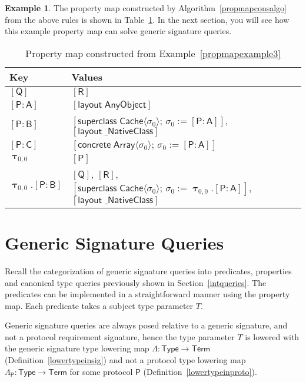 \documentclass[headsepline,bibliography=totoc]{scrreport}
\newcommand{\namesym}[1]{\mathsf{#1}}
\newcommand{\proto}[1]{\bm{\mathsf{#1}}}
\newcommand{\protosym}[1]{[\proto{#1}]}
\newcommand{\genericsym}[2]{\bm{\uptau}_{#1,#2}}
\newcommand{\assocsym}[2]{[\proto{#1}\colon\namesym{#2}]}
\newcommand{\layoutsym}[1]{[\mathsf{layout\;#1}]}
\newcommand{\supersym}[1]{[\mathsf{superclass}\;#1]}
\newcommand{\concretesym}[1]{[\mathsf{concrete}\;#1]}
\theoremstyle{definition}
\newtheorem{example}{Example}[chapter]
\theoremstyle{definition}
\theoremstyle{definition}
\begin{document}
\begin{example}
The property map constructed by Algorithm~\ref{propmapconsalgo} from the above rules is shown in Table~\ref{propmapexample2table}.
In the next section, you will see how this example property map can solve generic signature queries.
\begin{table}\caption{Property map constructed from Example~\ref{propmapexample3}}\label{propmapexample2table}
\begin{center}
\begin{tabular}{|l|l|}
\hline
Key&Values\\
\hline
\hline
$\protosym{Q}$&$\protosym{R}$\\
$\assocsym{P}{A}$&$\layoutsym{AnyObject}$\\
$\assocsym{P}{B}$&$\supersym{\namesym{Cache}\langle\sigma_0\rangle;\,\sigma_0:=\assocsym{P}{A}}$, $\layoutsym{\_NativeClass}$\\
$\assocsym{P}{C}$&$\concretesym{\namesym{Array}\langle\sigma_0\rangle;\,\sigma_0:=\assocsym{P}{A}}$\\
$\genericsym{0}{0}$&$\protosym{P}$\\
$\genericsym{0}{0}.\assocsym{P}{B}$&$\protosym{Q}$, $\protosym{R}$, $\supersym{\namesym{Cache}\langle\sigma_0\rangle;\,\sigma_0:=\genericsym{0}{0}.\assocsym{P}{A}}$, $\layoutsym{\_NativeClass}$\\
\hline
\end{tabular}
\end{center}
\end{table}
\end{example}

\section{Generic Signature Queries}\label{implqueries}

Recall the categorization of generic signature queries into predicates, properties and canonical type queries previously shown in Section~\ref{intqueries}. The predicates can be implemented in a straightforward manner using the property map. Each predicate takes a subject type parameter $T$.

Generic signature queries are always posed relative to a generic signature, and not a protocol requirement signature, hence the type parameter $T$ is lowered with the generic signature type lowering map $\Lambda\colon\namesym{Type}\rightarrow\namesym{Term}$ (Definition~\ref{lowertypeinsig}) and not a protocol type lowering map $\Lambda_{\proto{P}}\colon\namesym{Type}\rightarrow\namesym{Term}$ for some protocol $\proto{P}$ (Definition~\ref{lowertypeinproto}).
\end{document}
